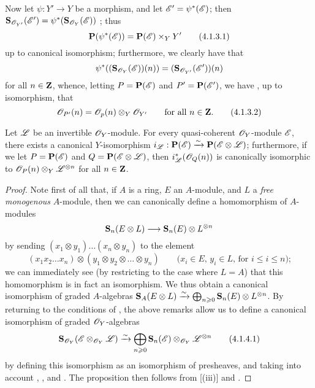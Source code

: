 \begin{env}[4.1.3]
\label{II.4.1.3}
Now let $\psi:Y'\to Y$ be a morphism, and let $\mathscr{E}'=\psi^*(\mathscr{E})$;
then $\mathbf{S}_{\mathscr{O}_{Y'}}(\mathscr{E}') = \psi^*(\mathbf{S}_{\mathscr{O}_Y}(\mathscr{E}))$ ;
thus 
\[
\label{II.4.1.3.1}
  \mathbf{P}(\psi^*(\mathscr{E})) = \mathbf{P}(\mathscr{E})\times_Y Y'
  \tag{4.1.3.1}
\]
up to canonical isomorphism;
furthermore, we clearly have that
\[
  \psi^*((\mathbf{S}_{\mathscr{O}_Y}(\mathscr{E}))(n)) = (\mathbf{S}_{\mathscr{O}_{Y'}}(\mathscr{E}'))(n)
\]
for all $n\in\mathbf{Z}$, whence, letting $P=\mathbf{P}(\mathscr{E})$ and $P'=\mathbf{P}(\mathscr{E}')$, we have , up to isomorphism, that
\[
\label{II.4.1.3.2}
  \mathscr{O}_{P'}(n) = \mathscr{O}_p(n)\otimes_Y\mathscr{O}_{Y'}
  \qquad\mbox{for all $n\in\mathbf{Z}$.}
  \tag{4.1.3.2}
\]
\end{env}

\begin{proposition}[4.1.4]
\label{II.4.1.4}
Let $\mathscr{L}$ be an invertible $\mathscr{O}_Y$-module.
For every quasi-coherent $\mathscr{O}_Y$-module $\mathscr{E}$, there exists a canonical $Y$-isomorphism $i_\mathscr{L}:\mathbf{P}(\mathscr{E})\xrightarrow{\sim}\mathbf{P}(\mathscr{E}\otimes\mathscr{L})$;
furthermore, if we let $P=\mathbf{P}(\mathscr{E})$ and $Q=\mathbf{P}(\mathscr{E}\otimes\mathscr{L})$, then $i_\mathscr{L}^*(\mathscr{O}_Q(n))$ is canonically isomorphic to $\mathscr{O}_P(n)\otimes_Y\mathscr{L}^{\otimes n}$ for all $n\in\mathbf{Z}$.
\end{proposition}

\begin{proof}
Note first of all that, if $A$ is a ring, $E$ an $A$-module, and $L$ a \emph{free monogenous} $A$-module, then we can canonically define a homomorphism of $A$-modules
\[
  \bb{S}_n(E\otimes L) \to \bb{S}_n(E)\otimes L^{\otimes n}
\]
by sending $(x_1\otimes y_1)\ldots(x_n\otimes y_n)$ to the element
\[
  (x_1x_2\ldots x_n)\otimes(y_1\otimes y_2\otimes\ldots\otimes y_n)
  \qquad\mbox{($x_i\in E$, $y_i\in L$, for $i\leq i\leq n$);}
\]
we can immediately see (by restricting to the case where $L=A$) that this homomorphism is in fact an isomorphism.
We thus obtain a canonical isomorphism of graded $A$-algebras $\mathbf{S}_A(E\otimes L)\xrightarrow{\sim}\bigoplus_{n\geqslant0}\mathbf{S}_n(E)\otimes L^{\otimes n}$.
By returning to the conditions of , the above remarks allow us to define a canonical isomorphism of graded $\mathscr{O}_Y$-algebras
\[
\label{II.4.1.4.1}
  \mathbf{S}_{\mathscr{O}_Y}(\mathscr{E}\otimes_{\mathscr{O}_Y}\mathscr{L}) \xrightarrow{\sim} \bigoplus_{n\geqslant0}\mathbf{S}_n(\mathscr{E})\otimes_{\mathscr{O}_Y}\mathscr{L}^{\otimes n}
  \tag{4.1.4.1}
\]
by defining this isomorphism as an isomorphism of presheaves, and taking into account , , and .
The proposition then follows from [(iii)] and .
\end{proof}


